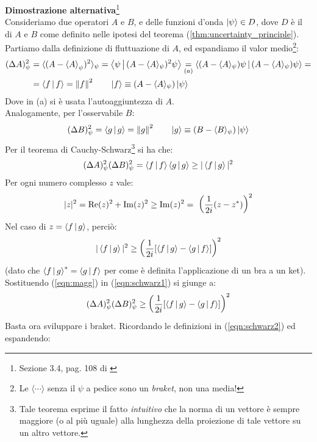 \documentclass[../../FisicaTeorica.tex]{subfiles}
\begin{document}
\begin{expl}
\textbf{Dimostrazione alternativa}\footnote{Sezione 3.4, pag. 108 di \cite{griffiths}}\\
Consideriamo due operatori $A$ e $B$, e delle funzioni d'onda $\Ket{\psi} \in D$, dove $D$ è il  di $A$ e $B$ come definito nelle ipotesi del teorema (\ref{thm:uncertainty_principle}).\\
Partiamo dalla definizione di fluttuazione di $A$, ed espandiamo il valor medio\footnote{Le $\langle \cdots \rangle$ senza il $\psi$ a pedice sono un \textit{braket}, non una media!}:
\begin{align}\nonumber
(\Delta A)_\psi^2 &= \langle (A-\left\langle{A}\right\rangle_\psi)^2 \rangle_\psi = \Braket{\psi|(A-\langle A \rangle_\psi)^2\psi}\underset{(a)}{=}\Braket{(A-\langle A\rangle_\psi)\psi|(A-\langle A \rangle_\psi)\psi} =\\
&= \Braket{f|f} = \left\lVert f\right\rVert^2 \qquad \Ket{f}\equiv (A-\langle A\rangle_\psi)\Ket{\psi}
\label{eqn:sigma_A}
\end{align}
Dove in (a) si è usata l'autoaggiuntezza di $A$.\\
Analogamente, per l'osservabile $B$:
\[
(\Delta B)^2_\psi = \Braket{g|g} = \left\lVert g\right\rVert^2 \qquad \Ket{g}\equiv (B-\langle B\rangle_\psi)\Ket{\psi}
\]
Per il teorema di Cauchy-Schwarz\footnote{Tale teorema esprime il fatto \textit{intuitivo} che la norma di un vettore è sempre maggiore (o al più uguale) alla lunghezza della proiezione di tale vettore su un altro vettore.} si ha che:
\begin{equation}
(\Delta A)^2_\psi (\Delta B)^2_\psi = \Braket{f|f}\Braket{g|g} \geq |\Braket{f|g}|^2
\label{eqn:schwarz1}
\end{equation}
Per ogni numero complesso $z$ vale:
\[
|z|^2=\operatorname{Re}(z)^2+\operatorname{Im}(z)^2 \geq \operatorname{Im}(z)^2 =\ \left(\frac{1}{2i}(z-z^*)\right)^2
\]
Nel caso di $z = \Braket{f|g}$, perciò:
\begin{equation}
|\Braket{f|g}|^2\geq \left(\frac{1}{2i}[\Braket{f|g}-\Braket{g|f}]\right)^2
\label{eqn:magg}
\end{equation}
(dato che $\Braket{f|g}^* =\Braket{g|f}$ per come è definita l'applicazione di un bra a un ket).\\
Sostituendo (\ref{eqn:magg}) in (\ref{eqn:schwarz1}) si giunge a:
\begin{equation}
(\Delta A)^2_\psi (\Delta B)^2_\psi \geq \left(\frac{1}{2i}[\Braket{f|g}-\Braket{g|f}]\right)^2
\label{eqn:schwarz2}
\end{equation}
Basta ora sviluppare i braket. Ricordando le definizioni in (\ref{eqn:schwarz2}) ed espandendo:

\end{expl}
\end{document}

